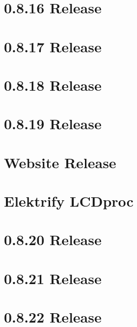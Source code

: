 \let\mypdfximage\pdfximage\def\pdfximage{\immediate\mypdfximage}\documentclass[twoside]{book}
\newcommand{\+}{\discretionary{\mbox{\scriptsize$\hookleftarrow$}}{}{}}
\begin{document}
\chapter{0.8.16 Release}
\label{doc_news_2016-04-29_0_8_16_md}

\chapter{0.8.17 Release}
\label{doc_news_2016-06-14_0_8_17_md}

\chapter{0.8.18 Release}
\label{doc_news_2016-09-17_0_8_18_md}

\chapter{0.8.19 Release}
\label{doc_news_2016-11-22_0_8_19_md}

\chapter{Website Release}
\label{doc_news_2016-12-17_website_release_md}

\chapter{Elektrify LCDproc}
\label{doc_news_2017-03-18_lcdproc_md}

\chapter{0.8.20 Release}
\label{doc_news_2017-10-31_0_8_20_md}

\chapter{0.8.21 Release}
\label{doc_news_2017-12-22_0_8_21_md}

\chapter{0.8.22 Release}
\label{doc_news_2018-03-27_0_8_22_md}

\end{document}
